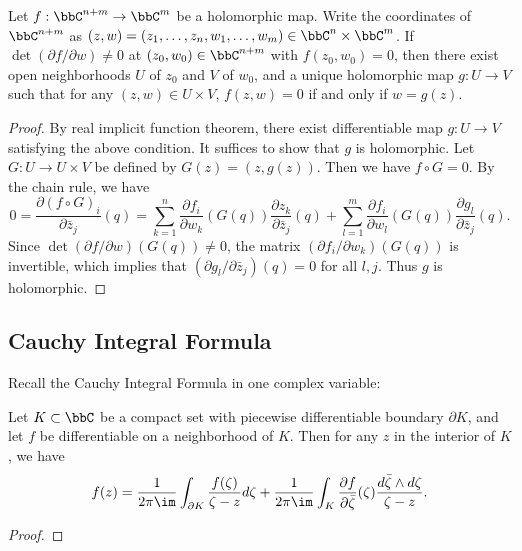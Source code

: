     \begin{theorem}\label{thm:holomorphic_implicit_function_theorem}
        Let \(f: \bbC^{n+m} \to \bbC^m\) be a holomorphic map. 
        Write the coordinates of \(\bbC^{n+m}\) as \((z,w) = (z_1, \ldots, z_n, w_1, \ldots, w_m) \in \bbC^n \times \bbC^m\).
        If \(\det(\partial f/\partial w) \neq 0\) at \((z_0, w_0) \in \bbC^{n+m}\) with \(f(z_0, w_0) = 0\),
        then there exist open neighborhoods \(U\) of \(z_0\) and \(V\) of \(w_0\), and a unique holomorphic map \(g: U \to V\) such that for any \((z, w) \in U \times V\), \(f(z, w) = 0\) if and only if \(w = g(z)\).
    \end{theorem}
    \begin{proof}
        By real implicit function theorem, there exist differentiable map \(g:U \to V\) satisfying the above condition.
        It suffices to show that \(g\) is holomorphic.
        Let \(G: U \to U \times V\) be defined by \(G(z) = (z, g(z))\).
        Then we have \(f \circ G = 0\).
        By the chain rule, we have
        \[ 0 = \frac{\partial (f\circ G)_i}{\partial \bar{z}_j}(q) = \sum_{k=1}^n \frac{\partial f_i}{\partial w_k}(G(q)) \frac{\partial z_k}{\partial \bar{z}_j}(q) + \sum_{l=1}^m \frac{\partial f_i}{\partial w_l}(G(q)) \frac{\partial g_l}{\partial \bar{z}_j}(q). \]
        Since \(\det(\partial f/\partial w)(G(q)) \neq 0\), the matrix \((\partial f_i/\partial w_k)(G(q))\) is invertible, which implies that \((\partial g_l/\partial \bar{z}_j)(q) = 0\) for all \(l,j\).
        Thus \(g\) is holomorphic.
    \end{proof}

\subsection{Cauchy Integral Formula}

    Recall the Cauchy Integral Formula in one complex variable:

    \begin{theorem}\label{thm:Cauchy_Integral_Formula_in_one_complex_variable}
        Let \(K \subset \bbC\) be a compact set with piecewise differentiable boundary \(\partial K\), and let \(f\) be differentiable on a neighborhood of \(K\). 
        Then for any \(z\) in the interior of \(K\), we have 
        \[ f(z) = \frac{1}{2\pi \im } \int_{\partial K} \frac{f(\zeta)}{\zeta - z} d\zeta + \frac{1}{2\pi \im} \int_K \frac{\partial f}{\partial \bar{\zeta}}(\zeta) \frac{d\bar{\zeta} \wedge d\zeta}{\zeta - z}. \]
    \end{theorem}
    \begin{proof}
    \end{proof}

